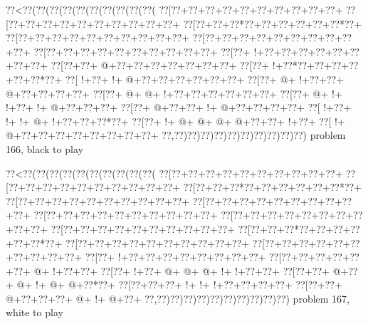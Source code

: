\vbox{\vbox{\goo
\0??<\0??(\0??(\0??(\0??(\0??(\0??(\0??(\0??(\0??(\0??(
\0??[\0??+\0??+\0??+\0??+\0??+\0??+\0??+\0??+\0??+\0??+
\0??[\0??+\0??+\0??+\0??+\0??+\0??+\0??+\0??+\0??+\0??+
\0??[\0??+\0??+\0??*\0??+\0??+\0??+\0??+\0??+\0??*\0??+
\0??[\0??+\0??+\0??+\0??+\0??+\0??+\0??+\0??+\0??+\0??+
\0??[\0??+\0??+\0??+\0??+\0??+\0??+\0??+\0??+\0??+\0??+
\0??[\0??+\0??+\0??+\0??+\0??+\0??+\0??+\0??+\0??+\0??+
\0??[\0??+\- !+\0??+\0??+\0??+\0??+\0??+\0??+\0??+\0??+
\0??[\0??+\0??+\- @+\0??+\0??+\0??+\0??+\0??+\0??+\0??+
\0??[\0??+\- !+\0??*\0??+\0??+\0??+\0??+\0??+\0??*\0??+
\0??[\- !+\0??+\- !+\- @+\0??+\0??+\0??+\0??+\0??+\0??+
\0??[\0??+\- @+\- !+\0??+\0??+\- @+\0??+\0??+\0??+\0??+
\0??[\0??+\- @+\- @+\- !+\0??+\0??+\0??+\0??+\0??+\0??+
\0??[\0??+\- @+\- !+\- !+\0??+\- !+\- @+\0??+\0??+\0??+
\0??[\0??+\- @+\0??+\0??+\- !+\- @+\0??+\0??+\0??+\0??+
\0??[\- !+\0??+\- !+\- !+\- @+\- !+\0??+\0??+\0??*\0??+
\0??[\0??+\- !+\- @+\- @+\- @+\- @+\0??+\0??+\- !+\0??+
\0??[\- !+\- @+\0??+\0??+\0??+\0??+\0??+\0??+\0??+\0??+
\0??,\0??)\0??)\0??)\0??)\0??)\0??)\0??)\0??)\0??)\0??)
}
\hfil problem 166, black to play\hfil\break
}

\vbox{\vbox{\goo
\0??<\0??(\0??(\0??(\0??(\0??(\0??(\0??(\0??(\0??(\0??(
\0??[\0??+\0??+\0??+\0??+\0??+\0??+\0??+\0??+\0??+\0??+
\0??[\0??+\0??+\0??+\0??+\0??+\0??+\0??+\0??+\0??+\0??+
\0??[\0??+\0??+\0??*\0??+\0??+\0??+\0??+\0??+\0??*\0??+
\0??[\0??+\0??+\0??+\0??+\0??+\0??+\0??+\0??+\0??+\0??+
\0??[\0??+\0??+\0??+\0??+\0??+\0??+\0??+\0??+\0??+\0??+
\0??[\0??+\0??+\0??+\0??+\0??+\0??+\0??+\0??+\0??+\0??+
\0??[\0??+\0??+\0??+\0??+\0??+\0??+\0??+\0??+\0??+\0??+
\0??[\0??+\0??+\0??+\0??+\0??+\0??+\0??+\0??+\0??+\0??+
\0??[\0??+\0??+\0??*\0??+\0??+\0??+\0??+\0??+\0??*\0??+
\0??[\0??+\0??+\0??+\0??+\0??+\0??+\0??+\0??+\0??+\0??+
\0??[\0??+\0??+\0??+\0??+\0??+\0??+\0??+\0??+\0??+\0??+
\0??[\0??+\- !+\0??+\0??+\0??+\0??+\0??+\0??+\0??+\0??+
\0??[\0??+\0??+\0??+\0??+\0??+\0??+\- @+\- !+\0??+\0??+
\0??[\0??+\- !+\0??+\- @+\- @+\- @+\- !+\- !+\0??+\0??+
\0??[\0??+\0??+\- @+\0??+\- @+\- !+\- @+\- @+\0??*\0??+
\0??[\0??+\0??+\0??+\- !+\- !+\- !+\0??+\0??+\0??+\0??+
\0??[\0??+\0??+\- @+\0??+\0??+\0??+\- @+\- !+\- @+\0??+
\0??,\0??)\0??)\0??)\0??)\0??)\0??)\0??)\0??)\0??)\0??)
}
\hfil problem 167, white to play\hfil\break
}

